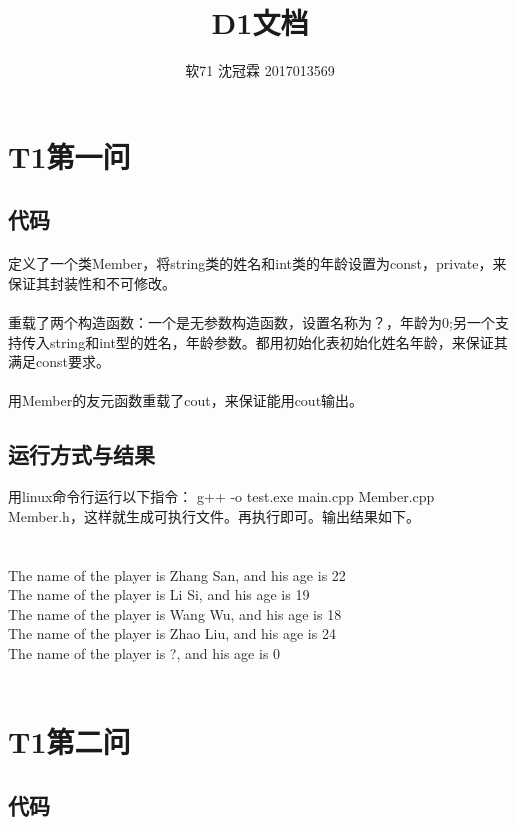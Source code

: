 \documentclass{article}
\title{D1文档}
\author{软71 沈冠霖 2017013569}
\begin{document}
\begin{CJK}{UTF8}{gkai}
\maketitle
\section{T1第一问} 
\subsection{代码} 
\paragraph{}定义了一个类Member，将string类的姓名和int类的年龄设置为const，private，来保证其封装性和不可修改。
\paragraph{}重载了两个构造函数：一个是无参数构造函数，设置名称为？，年龄为0;另一个支持传入string和int型的姓名，年龄参数。都用初始化表初始化姓名年龄，来保证其满足const要求。
\paragraph{}用Member的友元函数重载了cout，来保证能用cout输出。
\subsection{运行方式与结果}用linux命令行运行以下指令： g++ -o test.exe main.cpp Member.cpp Member.h，这样就生成可执行文件。再执行即可。输出结果如下。\\
\\
\\
The name of the player is Zhang San, and his age is 22\\
The name of the player is Li Si, and his age is 19\\
The name of the player is Wang Wu, and his age is 18\\
The name of the player is Zhao Liu, and his age is 24\\
The name of the player is ?, and his age is 0\\
\\
\section{T1第二问} 
\subsection{代码} 

\end{CJK}
\end{document}
